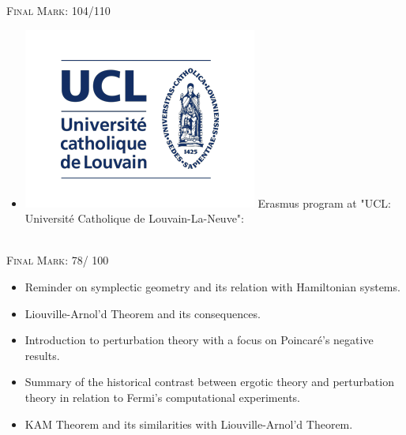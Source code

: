 \documentclass[10pt,a4paper]{altacv}
\begin{document}
\textsc{Final Mark}: 104/110
\begin{itemize}
\item   \includegraphics[scale=0.063]{UCL}  Erasmus program at "UCL: Universit\'e   Catholique de Louvain-La-Neuve": 
\end{itemize}
\divider
\\
\textsc{Final Mark}: 78/ 100









\begin{itemize}
\item  Reminder on symplectic geometry and its relation with Hamiltonian systems.
\item Liouville-Arnol'd Theorem and its consequences.
\item Introduction to perturbation theory with a focus on  Poincar\'e's negative results.
\item  Summary of the historical contrast between ergotic theory and perturbation theory in  relation to Fermi's computational experiments.
\item KAM Theorem and its similarities with Liouville-Arnol'd Theorem.
\end{itemize}
\end{document}
